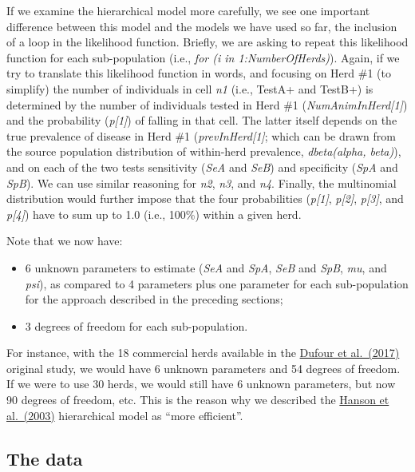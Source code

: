 \documentclass[
]{book}
\providecommand{\tightlist}{%
  \setlength{\itemsep}{0pt}\setlength{\parskip}{0pt}}
\begin{document}
If we examine the hierarchical model more carefully, we see one important difference between this model and the models we have used so far, the inclusion of a loop in the likelihood function. Briefly, we are asking to repeat this likelihood function for each sub-population (i.e., \emph{for (i in 1:NumberOfHerds)}). Again, if we try to translate this likelihood function in words, and focusing on Herd \#1 (to simplify) the number of individuals in cell \emph{n1} (i.e., TestA+ and TestB+) is determined by the number of individuals tested in Herd \#1 (\emph{NumAnimInHerd{[}1{]}}) and the probability (\emph{p{[}1{]}}) of falling in that cell. The latter itself depends on the true prevalence of disease in Herd \#1 (\emph{prevInHerd{[}1{]}}; which can be drawn from the source population distribution of within-herd prevalence, \emph{dbeta(alpha, beta)}), and on each of the two tests sensitivity (\emph{SeA} and \emph{SeB}) and specificity (\emph{SpA} and \emph{SpB}). We can use similar reasoning for \emph{n2}, \emph{n3}, and \emph{n4}. Finally, the multinomial distribution would further impose that the four probabilities (\emph{p{[}1{]}}, \emph{p{[}2{]}}, \emph{p{[}3{]}}, and \emph{p{[}4{]}}) have to sum up to 1.0 (i.e., 100\%) within a given herd.

Note that we now have:

\begin{itemize}
\tightlist
\item
  6 unknown parameters to estimate (\emph{SeA} and \emph{SpA}, \emph{SeB} and \emph{SpB}, \emph{mu}, and \emph{psi}), as compared to 4 parameters plus one parameter for each sub-population for the approach described in the preceding sections;\\
\item
  3 degrees of freedom for each sub-population.
\end{itemize}

For instance, with the 18 commercial herds available in the \href{https://www.sciencedirect.com/science/article/pii/S016758771630527X?via\%3Dihub}{Dufour et al.~(2017)} original study, we would have 6 unknown parameters and 54 degrees of freedom. If we were to use 30 herds, we would still have 6 unknown parameters, but now 90 degrees of freedom, etc. This is the reason why we described the \href{https://link.springer.com/article/10.1198/1085711031526}{Hanson et al.~(2003)} hierarchical model as ``more efficient''.

\subsection{The data}\label{the-data-1}
\end{document}
